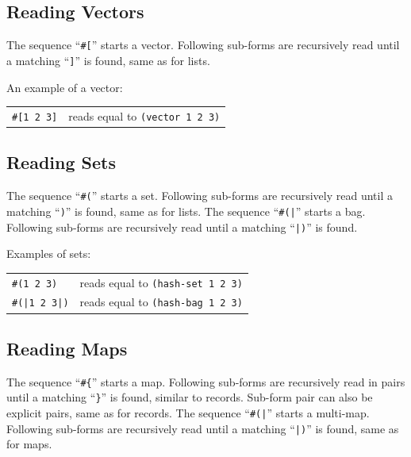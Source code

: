 \subsection{Reading Vectors}
\label{subsec:aml-base-lang-reader-vectors}

The sequence ``\lstinline!#[!'' starts a vector. Following sub-forms are recursively read until a matching ``\lstinline!]!'' is found, same as for lists.

\example An example of a vector:

\begin{tabular}{ l l }
  \lstinline!#[1 2 3]! & reads equal to \lstinline!(vector 1 2 3)! \\
\end{tabular}





\subsection{Reading Sets}
\label{subsec:aml-base-lang-reader-sets}

The sequence ``\lstinline!#(!'' starts a set. Following sub-forms are recursively read until a matching ``\lstinline!)!'' is found, same as for lists. The sequence ``\lstinline!#(|!'' starts a bag. Following sub-forms are recursively read until a matching ``\lstinline!|)!'' is found.

\example Examples of sets:

\begin{tabular}{ l l }
  \lstinline!#(1 2 3)! & reads equal to \lstinline!(hash-set 1 2 3)! \\
  \lstinline!#(|1 2 3|)! & reads equal to \lstinline!(hash-bag 1 2 3)! \\
\end{tabular}





\subsection{Reading Maps}
\label{subsec:aml-base-lang-reader-maps}

The sequence ``\lstinline!#{!'' starts a map. Following sub-forms are recursively read in pairs until a matching ``\lstinline!}!'' is found, similar to records. Sub-form pair can also be explicit pairs, same as for records. The sequence ``\lstinline!#(|!'' starts a multi-map. Following sub-forms are recursively read until a matching ``\lstinline!|)!'' is found, same as for maps.

